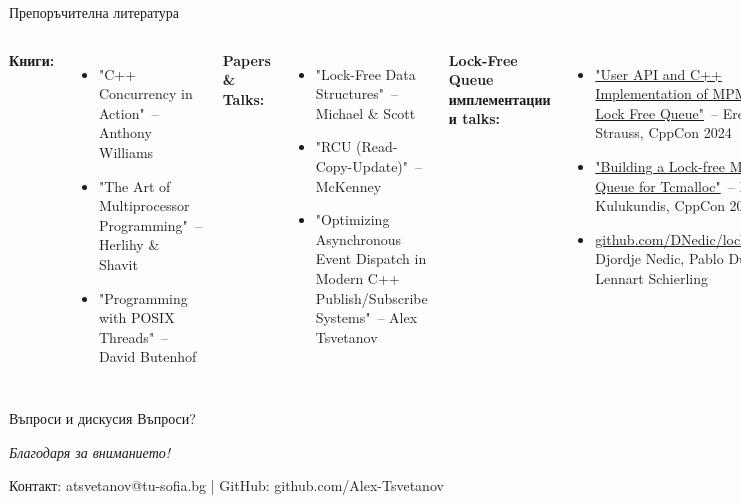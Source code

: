 \documentclass[aspectratio=169]{beamer}
\begin{document}
\begin{frame}{Препоръчителна литература}
\footnotesize
\begin{columns}
        \textbf{Книги:}
        \begin{itemize}
            \item "C++ Concurrency in Action"\ – Anthony Williams
            \item "The Art of Multiprocessor Programming"\ – Herlihy \& Shavit
            \item "Programming with POSIX Threads"\ – David Butenhof
        \end{itemize}
        \textbf{Papers \& Talks:}
        \begin{itemize}
            \item "Lock-Free Data Structures"\ – Michael \& Scott
            \item "RCU (Read-Copy-Update)"\ – McKenney
            \item "Optimizing Asynchronous Event Dispatch in Modern C++ Publish/Subscribe Systems"\ – Alex Tsvetanov
        \end{itemize}
        \textbf{Lock-Free Queue имплементации и talks:}
        \begin{itemize}
            \item \href{https://www.youtube.com/watch?v=bjz_bMNNWRk}{"User API and C++ Implementation of MPMC Lock Free Queue"}\ – Erez Strauss, CppCon 2024
            \item \href{https://www.youtube.com/watch?v=_qaKkHuHYE0}{"Building a Lock-free MPMC Queue for Tcmalloc"}\ – Matt Kulukundis, CppCon 2021
            \item \href{https://github.com/DNedic/lockfree}{github.com/DNedic/lockfree}\ – Djordje Nedic, Pablo Duboue, Lennart Schierling
        \end{itemize}
        
        \textbf{Online ресурси:}
        \begin{itemize}
            \item \href{https://en.cppreference.com}{cppreference.com} – coroutines, atomics, memory ordering
            \item \href{https://preshing.com}{preshing.com} – lock-free programming blog
            \item \href{https://www.1024cores.net/home/lock-free-algorithms}{1024cores.net} – Dmitry Vyukov's concurrency blog
        \end{itemize}
\end{columns}
\end{frame}

\begin{frame}{Въпроси и дискусия}
\centering
\Huge{Въпроси?}

\vspace{4cm}
\textit{Благодаря за вниманието!}

\vspace{0.5cm}
\small
Контакт: atsvetanov@tu-sofia.bg | GitHub: github.com/Alex-Tsvetanov
\end{frame}
\end{document}
